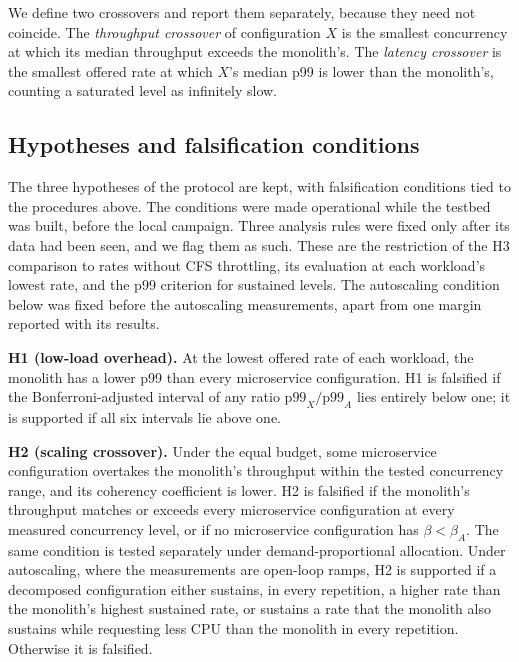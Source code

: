 We define two crossovers and report them separately, because they need not coincide. The \emph{throughput
crossover} of configuration $X$ is the smallest concurrency at which its median throughput exceeds the monolith's.
The \emph{latency crossover} is the smallest offered rate at which $X$'s median p99 is lower than the monolith's,
counting a saturated level as infinitely slow.

\subsection{Hypotheses and falsification conditions}
\label{sec:hypotheses}

The three hypotheses of the protocol are kept, with falsification conditions tied to the procedures above. The
conditions were made operational while the testbed was built, before the local campaign. Three analysis rules
were fixed only after its data had been seen, and we flag them as such. These are the restriction of the H3
comparison to rates without CFS throttling, its evaluation at each workload's lowest rate, and the p99 criterion
for sustained levels. The autoscaling condition below was fixed before the autoscaling measurements, apart from one margin
reported with its results.

\textbf{H1 (low-load overhead).} At the lowest offered rate of each workload, the monolith has a lower p99
than every microservice configuration. H1 is falsified if the Bonferroni-adjusted interval of any ratio
$\mathrm{p99}_X/\mathrm{p99}_A$ lies entirely below one; it is supported if all six intervals lie above one.

\textbf{H2 (scaling crossover).} Under the equal budget, some microservice configuration overtakes the
monolith's throughput within the tested concurrency range, and its coherency coefficient is lower. H2 is
falsified if the monolith's throughput matches or exceeds every microservice configuration at every measured
concurrency level, or if no microservice configuration has $\beta < \beta_A$. The same condition is tested
separately under demand-proportional allocation. Under autoscaling, where the measurements are open-loop ramps, H2 is supported if a decomposed configuration either sustains, in every repetition, a higher rate than the
monolith's highest sustained rate, or sustains a rate that the monolith also sustains while requesting less CPU
than the monolith in every repetition. Otherwise it is falsified.

